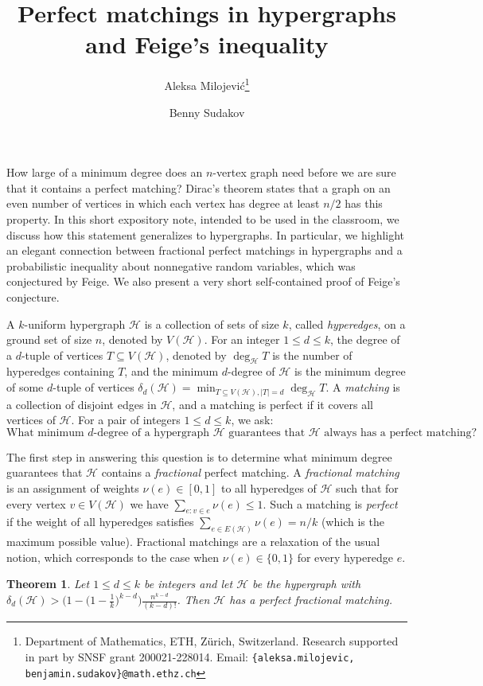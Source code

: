 \documentclass[10pt]{article}
\title{\vspace{-0.7cm} Perfect matchings in hypergraphs and Feige's inequality}
\author{Aleksa Milojevi\'c\thanks{Department of Mathematics, ETH, Z\"urich, Switzerland. Research supported in part by SNSF grant 200021-228014. {Email}: {\tt \{aleksa.milojevic, benjamin.sudakov\}@math.ethz.ch}} \and Benny Sudakov\footnotemark[1]}
\date{}
\newtheorem{theorem}{Theorem}
\newcommand{\cH}{\mathcal{H}}
\begin{document}

\maketitle
\vspace{-0.2cm}

How large of a minimum degree does an $n$-vertex graph need before we are sure that it contains a perfect matching? Dirac's theorem states that a graph on an even number of vertices in which each vertex has degree at least $n/2$ has this property. In this short expository note, intended to be used in the classroom, we discuss how this statement generalizes to hypergraphs. In particular, we highlight an elegant connection between fractional perfect matchings in hypergraphs and a probabilistic inequality about nonnegative random variables, which was conjectured by Feige. We also present a very short self-contained proof of Feige's conjecture. 

A $k$-uniform hypergraph $\cH$ is a collection of sets of size $k$, called \textit{hyperedges}, on a ground set of size $n$, denoted by $V(\cH)$. For an integer $1\leq d\leq k$, the degree of a $d$-tuple of vertices $T\subseteq V(\cH)$, denoted by $\deg_\cH T$ is the number of hyperedges containing $T$, and the minimum $d$-degree of $\cH$ is the minimum degree of some $d$-tuple of vertices $\delta_d(\cH)=\min_{T\subseteq V(\cH), |T|=d} \deg_\cH T$. A \textit{matching} is a collection of disjoint edges in $\cH$, and a matching is perfect if it covers all vertices of $\cH$. For a pair of integers $1\leq d\leq k$, we ask:
\vspace{-0.2cm}
\[\text{What minimum $d$-degree of a hypergraph $\cH$ guarantees that $\cH$ always has a perfect matching?} \] 
\vspace{-0.8cm}

\noindent
The first step in answering this question is to determine what minimum degree guarantees that $\cH$ contains a \textit{fractional} perfect matching. A \textit{fractional matching} is an assignment of weights $\nu(e)\in [0, 1]$ to all hyperedges of $\cH$ such that for every vertex $v\in V(\cH)$ we have $\sum_{e:v\in e}\nu(e)\leq 1$. Such a matching is \textit{perfect} if the weight of all hyperedges satisfies $\sum_{e\in E(\cH)}\nu(e)=n/k$ (which is the maximum possible value). Fractional matchings are a relaxation of the usual notion, which corresponds to the case when $\nu(e)\in \{0, 1\}$ for every hyperedge $e$.

\begin{theorem}\label{thm:fractional_matching}
Let $1\leq d\leq k$ be integers and let $\cH$ be the hypergraph with $\delta_d (\cH)> \Big(1-\big(1-\frac{1}{k}\big)^{k-d}\Big)\frac{n^{k-d}}{(k-d)!}$. Then $\cH$ has a perfect fractional matching.
\end{theorem}
\end{document}
